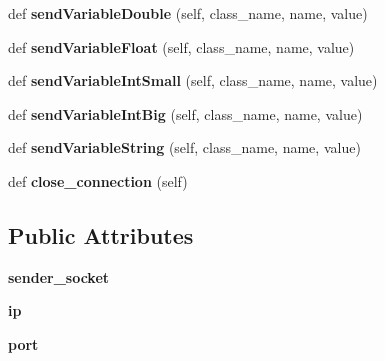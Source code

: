 \begin{DoxyCompactItemize}
\item 
\hypertarget{classinsight__client_1_1InsightClient_aa6b84982b43cc0b035c1a67b427b7703}{}def {\bfseries send\+Variable\+Double} (self, class\+\_\+name, name, value)\label{classinsight__client_1_1InsightClient_aa6b84982b43cc0b035c1a67b427b7703}

\item 
\hypertarget{classinsight__client_1_1InsightClient_a97456977d92fa0d582f67f1bfa8fa6f2}{}def {\bfseries send\+Variable\+Float} (self, class\+\_\+name, name, value)\label{classinsight__client_1_1InsightClient_a97456977d92fa0d582f67f1bfa8fa6f2}

\item 
\hypertarget{classinsight__client_1_1InsightClient_a4daceeb2679929bebe4a4ef546bc7142}{}def {\bfseries send\+Variable\+Int\+Small} (self, class\+\_\+name, name, value)\label{classinsight__client_1_1InsightClient_a4daceeb2679929bebe4a4ef546bc7142}

\item 
\hypertarget{classinsight__client_1_1InsightClient_a311cdd084d94906a70cb90c0bd0ebc30}{}def {\bfseries send\+Variable\+Int\+Big} (self, class\+\_\+name, name, value)\label{classinsight__client_1_1InsightClient_a311cdd084d94906a70cb90c0bd0ebc30}

\item 
\hypertarget{classinsight__client_1_1InsightClient_a6016938cd631acf9b4d28e37f2037608}{}def {\bfseries send\+Variable\+String} (self, class\+\_\+name, name, value)\label{classinsight__client_1_1InsightClient_a6016938cd631acf9b4d28e37f2037608}

\item 
\hypertarget{classinsight__client_1_1InsightClient_a7938f9621d43eb201f6df1ef377e5544}{}def {\bfseries close\+\_\+connection} (self)\label{classinsight__client_1_1InsightClient_a7938f9621d43eb201f6df1ef377e5544}

\end{DoxyCompactItemize}
\subsection*{Public Attributes}
\begin{DoxyCompactItemize}
\item 
\hypertarget{classinsight__client_1_1InsightClient_ac5d0038b7be7f963967a300c84354158}{}{\bfseries sender\+\_\+socket}\label{classinsight__client_1_1InsightClient_ac5d0038b7be7f963967a300c84354158}

\item 
\hypertarget{classinsight__client_1_1InsightClient_af1a490005b64ca5deb3701678db9cc37}{}{\bfseries ip}\label{classinsight__client_1_1InsightClient_af1a490005b64ca5deb3701678db9cc37}

\item 
\hypertarget{classinsight__client_1_1InsightClient_ae432dbbcf1420593a59248936272af72}{}{\bfseries port}\label{classinsight__client_1_1InsightClient_ae432dbbcf1420593a59248936272af72}

\end{DoxyCompactItemize}


